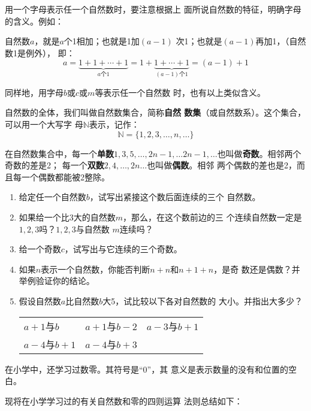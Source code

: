     用一个字母表示任一个自然数时，要注意根据上
    面所说自然数的特征，明确字母的含义。例如：

    自然数$a$，就是$a$个1相加；也就是1加$(a- 1)$
次1；也就是$(a-1)$再加1，（自然数1是例外），
即：
\[a=\underbrace{1+1+\cdots+1}_{a\text{个} 1}=1+\underbrace{1+\cdots+1}_{(a-1)\text{个} 1} = (a-1)+1\]

同样地，用字母$b$或$c$或$m$等表示任一个自然数
时，也有以上类似含义。

    自然数的全体，我们叫做自然数集合，简称\textbf{自然
数集}（或自然数系）。这个集合，可以用一个大写字
母$\mathbb{N}$表示，记作：
\[\mathbb{N}=\{1,2,3,\ldots,n,\ldots \} \]

在自然数集合中，每一个\textbf{单数}$1, 3, 5,\ldots, 2n-1,\ldots 2n-1,\ldots$也叫做\textbf{奇数}。相邻两个奇数的差是2；
每一个\textbf{双数}$2 ,  4 , \ldots,  2n\ldots$也叫做\textbf{偶数}。相邻
两个偶数的差也是2，而且每一个偶数都能被2整除。

\begin{ex}
\begin{enumerate}
    \item  给定任一个自然数$b$，试写出紧接这个数后面连续的三个
      自然数。
      \item  如果给一个比3大的自然数$m$，那么，在这个数前边的三
      个连续自然数一定是$1,  2,  3$吗？$1,  2,  3$与自然数
      $m$连续吗？
      \item  给一个奇数$c$，试写出与它连续的三个奇数。
      \item  如果$n$表示一个自然数，你能否判断$n+n$和$n+1+n$，是奇
      数还是偶数？并举例验证你的结论。
      \item 假设自然数$a$比自然数$b$大5，试比较以下各对自然数的
        大小。并指出大多少？
\begin{center}
    \begin{tabular}{lll}
    $a+1$与$b$&
    $a + 1$与$b-2$&
    $a-3$与$b + 1$\\
    $a-4$与$b+1$&
    $a-4$与$b+ 3$\\
\end{tabular}
\end{center}

    \end{enumerate}  
\end{ex}

在小学中，还学习过数零。其符号是“0”，其
意义是表示数量的没有和位置的空白。

    现将在小学学习过的有关自然数和零的四则运算
法则总结如下：

